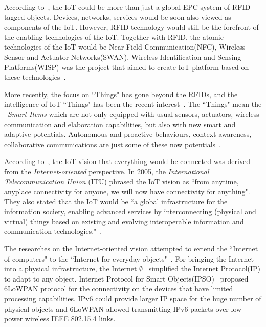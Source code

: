 According to~\cite{Presser:2009}, the IoT could be more than just a global EPC system of RFID tagged objects.
Devices, networks, services would be soon also viewed as components of the IoT.
However, RFID technology would still be the forefront of the enabling technologies of the IoT.
Together with RFID, the atomic technologies of the IoT would be Near Field Communication(NFC), Wireless Sensor and Actuator Networks(SWAN).
Wireless Identification and Sensing Platforms(WISP) was the project that aimed to create IoT platform based on these technologies~\citep{Buettner:2008}.

More recently, the focus on ``Things" has gone beyond the RFIDs, and the intelligence of IoT ``Things" has been the recent interest~\citep{Sundmaeker:2010}.
The ``Things" mean the ~\textit{Smart Items} which are not only equipped with usual sensors, actuators, wireless communication and elaboration capabilities, but also with new smart and adaptive potentials.
Autonomous and proactive behaviours, context awareness, collaborative communications are just some of these now potentials~\citep{Atzori:2014}.

According to~\cite{Atzori:2010}, the IoT vision that everything would be connected was derived from the \textit{Internet-oriented} perspective.
In 2005, the \textit{International Telecommunication Union} (ITU)  phrased the IoT vision as ``from anytime, anyplace connectivity for anyone, we will now have connectivity for anything". They also stated that the IoT would be ``a global infrastructure for the information society, enabling advanced services by interconnecting (physical and virtual) things based on existing and evolving interoperable information and communication technologies."~\citep{ITU:2005}.


The researches on the Internet-oriented vision attempted to extend the ``Internet of computers" to the ``Internet for everyday objects"~\citep{Mattern:2010}.
For bringing the Internet into a physical infrastructure, the Internet $\emptyset$~\citep{Gershenfeld:2006} simplified the Internet Protocol(IP) to adapt to any object.
Internet Protocol for Smart Objects(IPSO)~\citep{Dunkels:2008} proposed 6LoWPAN protocol for the connectivity on the devices that have limited processing capabilities.
IPv6 could provide larger IP space for the huge number of physical objects and 6LoWPAN allowed transmitting IPv6 packets over low power wireless IEEE 802.15.4 links.

